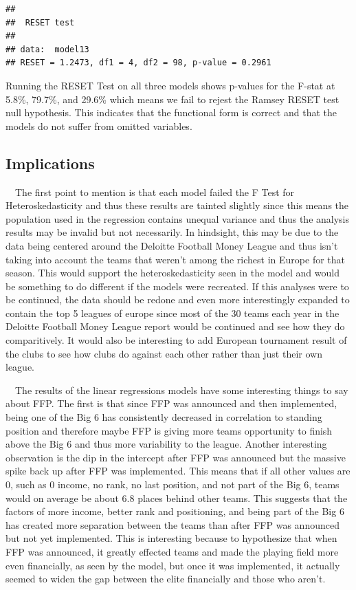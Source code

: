 \documentclass[
  12pt,
]{article}
\begin{document}
\begin{verbatim}
## 
##  RESET test
## 
## data:  model13
## RESET = 1.2473, df1 = 4, df2 = 98, p-value = 0.2961
\end{verbatim}

Running the RESET Test on all three models shows p-values for the F-stat
at 5.8\%, 79.7\%, and 29.6\% which means we fail to rejest the Ramsey
RESET test null hypothesis. This indicates that the functional form is
correct and that the models do not suffer from omitted variables.

\newpage

\subsection{Implications}\label{implications}

~~The first point to mention is that each model failed the F Test for
Heteroskedasticity and thus these results are tainted slightly since
this means the population used in the regression contains unequal
variance and thus the analysis results may be invalid but not
necessarily. In hindsight, this may be due to the data being centered
around the Deloitte Football Money League and thus isn't taking into
account the teams that weren't among the richest in Europe for that
season. This would support the heteroskedasticity seen in the model and
would be something to do different if the models were recreated. If this
analyses were to be continued, the data should be redone and even more
interestingly expanded to contain the top 5 leagues of europe since most
of the 30 teams each year in the Deloitte Football Money League report
would be continued and see how they do comparitively. It would also be
interesting to add European tournament result of the clubs to see how
clubs do against each other rather than just their own league.

~~The results of the linear regressions models have some interesting
things to say about FFP. The first is that since FFP was announced and
then implemented, being one of the Big 6 has consistently decreased in
correlation to standing position and therefore maybe FFP is giving more
teams opportunity to finish above the Big 6 and thus more variability to
the league. Another interesting observation is the dip in the intercept
after FFP was announced but the massive spike back up after FFP was
implemented. This means that if all other values are 0, such as 0
income, no rank, no last position, and not part of the Big 6, teams
would on average be about 6.8 places behind other teams. This suggests
that the factors of more income, better rank and positioning, and being
part of the Big 6 has created more separation between the teams than
after FFP was announced but not yet implemented. This is interesting
because to hypothesize that when FFP was announced, it greatly effected
teams and made the playing field more even financially, as seen by the
model, but once it was implemented, it actually seemed to widen the gap
between the elite financially and those who aren't.
\end{document}
